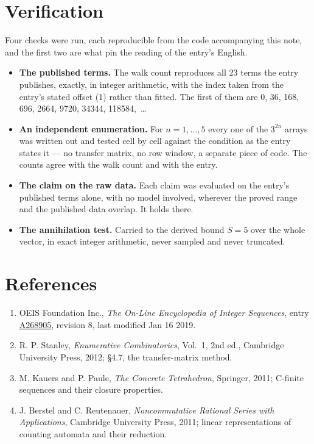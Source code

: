 \documentclass[11pt]{article}
\theoremstyle{definition}
\begin{document}
\section{Verification}

Four checks were run, each reproducible from the code accompanying this note, and the first two are what pin the reading of the entry's English.

\begin{itemize}

\item {\bfseries The published terms.} The walk count reproduces all 23 terms the entry publishes, exactly, in integer arithmetic, with the index taken from the entry's stated offset (1) rather than fitted. The first of them are 0, 36, 168, 696, 2664, 9720, 34344, 118584,~\dots

\item {\bfseries An independent enumeration.} For $n = 1,\dots,5$ every one of the $3^{2n}$ arrays was written out and tested cell by cell against the condition as the entry states it --- no transfer matrix, no row window, a separate piece of code. The counts agree with the walk count and with the entry.

\item {\bfseries The claim on the raw data.} Each claim was evaluated on the entry's published terms alone, with no model involved, wherever the proved range and the published data overlap. It holds there.

\item {\bfseries The annihilation test.} Carried to the derived bound $S = 5$ over the whole vector, in exact integer arithmetic, never sampled and never truncated.

\end{itemize}

\section{References}

\begin{enumerate}

\item OEIS Foundation Inc., \emph{The On-Line Encyclopedia of Integer Sequences}, entry \href{https://oeis.org/A268905}{A268905}, revision 8, last modified Jan 16 2019.

\item R. P. Stanley, \emph{Enumerative Combinatorics}, Vol.~1, 2nd ed., Cambridge University Press, 2012; \S4.7, the transfer-matrix method.

\item M. Kauers and P. Paule, \emph{The Concrete Tetrahedron}, Springer, 2011; C-finite sequences and their closure properties.

\item J. Berstel and C. Reutenauer, \emph{Noncommutative Rational Series with Applications}, Cambridge University Press, 2011; linear representations of counting automata and their reduction.

\end{enumerate}
\end{document}
